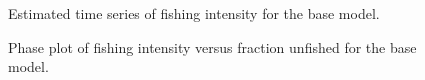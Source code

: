 \documentclass[
]{scrartcl}
\begin{document}
\begin{figure}[H]


\caption{\label{fig-spr}Estimated time series of fishing intensity for
the base model.}

\end{figure}%

\begin{figure}[H]


\caption{\label{fig-spr-phase}Phase plot of fishing intensity versus
fraction unfished for the base model.}

\end{figure}%
\end{document}
